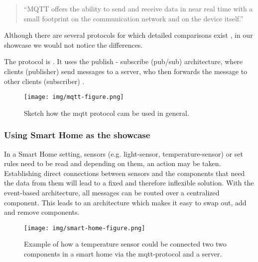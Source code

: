 \documentclass{article}
\begin{document}
\begin{quote}
    ``MQTT offers the ability to send and receive data in near real time with a small footprint on the communication network and on the device itself.'' \cite[p.~1]{8893617}
\end{quote}



Although there are several protocols for which detailed comparisons exist \cite{8755050}, in our showcase we would not notice the differences. 

The protocol is  \cite[p.~1]{8893617}. It uses the publish - subscribe (pub/sub) architecture, where clients (publisher) send messages to a server, who then forwards the message to other clients (subscriber) \cite{8755050}.

\begin{figure}
    \centering
    \texttt{[image: img/mqtt-figure.png]}
    \caption{Sketch how the mqtt protocol cam be used in general.}
    \label{fig:enter-label}
\end{figure}

\subsubsection{Using Smart Home as the showcase}

In a Smart Home setting, sensors (e.g. light-sensor, temperature-sensor) or set rules need to be read and depending on them, an action may be taken. Establishing direct connections between sensors and the components that need the data from them will lead to a fixed and therefore inflexible solution. With the event-based architecture, all messages can be routed over a centralized component. This leads to an architecture which makes it easy to swap out, add and remove components. 
\begin{figure}
    \centering
    \texttt{[image: img/smart-home-figure.png]}
    \caption{Example of how a temperature sensor could be connected two two components in a smart home via the mqtt-protocol and a server.}
    \label{fig:enter-label}
\end{figure}
\end{document}
